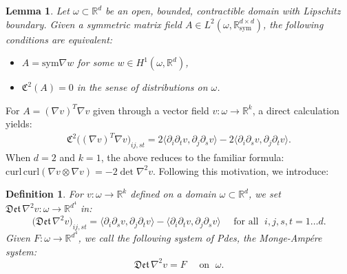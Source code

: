 \documentclass[reqno,twoside,11pt]{amsart}
\newcommand{\sym}{\mathrm{sym}}
\newcommand{\curl}{\mathrm{curl}}
\newcommand{\R}{\mathbb{R}}
\numberwithin{equation}{section}
\theoremstyle{plain}
\newtheorem{lemma}[theorem]{Lemma}
\newtheorem{definition}[theorem]{Definition}
\theoremstyle{definition}
\begin{document}
\begin{lemma}\label{th_equiv}
Let $\omega\subset \R^d$ be an open, bounded, contractible domain with
Lipschitz boundary. Given a symmetric matrix field $A\in
L^2(\omega,\R^{d\times d}_{\sym})$, the following conditions are equivalent:
\begin{itemize}
\item[(i)] $A=\sym\nabla w$ for some $w\in H^{1}(\omega,\R^d)$,
\item[(ii)] $\mathfrak{C}^2(A)=0$ in the sense of distributions on $\omega$.
\end{itemize}
\end{lemma}

\smallskip

\noindent For $A=(\nabla v)^T\nabla v$ given through a
vector field $v:\omega\to\R^k$, a direct calculation yields:
\begin{equation*}
\begin{split}
\mathfrak{C}^2\big((\nabla v)^T\nabla v\big)_{ij, st}
= 2 \langle \partial_i\partial_tv, \partial_j\partial_sv\rangle - 2 \langle \partial_i\partial_sv, \partial_j\partial_tv\rangle.
\end{split}
\end{equation*}
When $d=2$ and $k=1$, the above reduces to the familiar formula:
$\curl\,\curl (\nabla v\otimes\nabla v) = -2\det\nabla^2v$. Following
this motivation, we introduce:

\smallskip

\begin{definition}\label{defMA}
For $v: \omega\to \R^{k}$ defined on a domain $\omega\subset\R^d$, we
set $\mathfrak{Det}\,\nabla^2 v:\omega\to \R^{d^4}$ in:
\begin{equation}\label{DetMA}
\big(\mathfrak{Det}\,\nabla^2v\big)_{ij,st} =
\langle \partial_i\partial_sv, \partial_j\partial_tv\rangle -
\langle \partial_i\partial_tv, \partial_j\partial_sv\rangle 
\quad\mbox{ for all }\; i,j,s,t=1\ldots d.
\end{equation}
Given $F: \omega\to \R^{d^4}$, we call the following system of Pdes, the
Monge-Amp\'ere system:
$$\mathfrak{Det}\,\nabla^2v = F \quad\mbox{ on }\; \omega.$$
\end{definition}
\end{document}

